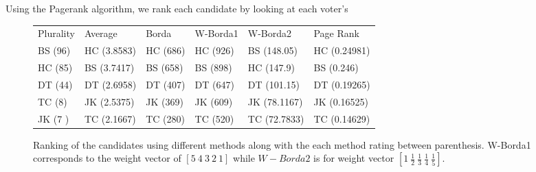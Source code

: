 \noindent Using the Pagerank algorithm, we rank each candidate by looking at each voter's 

\begin{figure}[tbh]
 \centering    
\begin{tabular}{ |p{2cm}|p{2.5cm}|p{3cm}|p{2cm}|p{2.5cm}|p{2.5cm}|}
 \hline
  Plurality & Average &  Borda & W-Borda1 & W-Borda2 & Page Rank \\ \hhline{|=|=|=|=|=|=|}
 \hline
   BS (96) & HC (3.8583) & HC (686) & HC (926) & BS (148.05) & HC (0.24981) \\
   HC (85) & BS (3.7417) & BS (658) & BS (898) & HC (147.9)  & BS (0.246)   \\
   DT (44) & DT (2.6958) & DT (407) & DT (647) & DT (101.15) & DT (0.19265) \\
   TC (8)  & JK (2.5375) & JK (369) & JK (609) & JK (78.1167)& JK (0.16525) \\
   JK (7 ) & TC (2.1667) & TC (280) & TC (520) & TC (72.7833)& TC (0.14629) \\ 
 \hline
\end{tabular}
\caption{Ranking of the candidates using different methods along with the each method rating between parenthesis. W-Borda1 corresponds to the weight vector of $[5\ 4\ 3\ 2\ 1]$ while $W-Borda2$ is for weight vector  $[1\ \frac{1}{2}\ \frac{1}{3}\ \frac{1}{4}\ \frac{1}{5}]$.} 
\end{figure} 
    
    
    
    
    
    
    
    
    
    
    
    
    
    
    
    
    
    
    
    
    